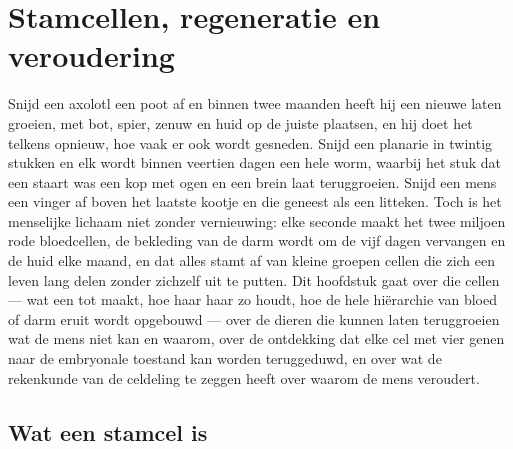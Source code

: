 \chapter{Stamcellen, regeneratie en veroudering}\label{ch:b3:stem-cells}

Snijd een axolotl een poot af en binnen twee maanden heeft hij een
nieuwe laten groeien, met bot, spier, zenuw en huid op de juiste
plaatsen, en hij doet het telkens opnieuw, hoe vaak er ook wordt
gesneden. Snijd een planarie in twintig stukken en elk wordt binnen
veertien dagen een hele worm, waarbij het stuk dat een staart was een
kop met ogen en een brein laat teruggroeien. Snijd een mens een vinger
af boven het laatste kootje en die geneest als een litteken. Toch is het
menselijke lichaam niet zonder vernieuwing: elke seconde maakt het twee
miljoen rode bloedcellen, de bekleding van de darm wordt om de vijf
dagen vervangen en de huid elke maand, en dat alles stamt af van kleine
groepen cellen die zich een leven lang delen zonder zichzelf uit te
putten. Dit hoofdstuk gaat over die cellen --- wat een  tot
 maakt, hoe haar  haar zo houdt, hoe de hele hiërarchie van
bloed of darm eruit wordt opgebouwd --- over de dieren die kunnen laten
teruggroeien wat de mens niet kan en waarom, over de ontdekking dat elke
cel met vier genen naar de embryonale toestand kan worden teruggeduwd,
en over wat de rekenkunde van de celdeling te zeggen heeft over waarom
de mens veroudert.

\section{Wat een stamcel is}

